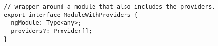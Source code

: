 \begin{verbatim}
// wrapper around a module that also includes the providers.
export interface ModuleWithProviders {
  ngModule: Type<any>;
  providers?: Provider[];
}
\end{verbatim}
